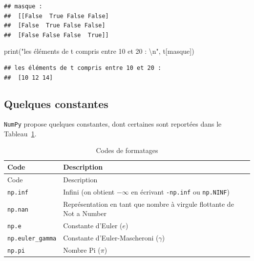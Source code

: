 \documentclass[
  12pt,
]{book}
\newenvironment{Shaded}{\begin{snugshade}}{\end{snugshade}}
\newcommand{\BuiltInTok}[1]{#1}
\newcommand{\CharTok}[1]{\textcolor[rgb]{0.31,0.60,0.02}{#1}}
\newcommand{\NormalTok}[1]{#1}
\newcommand{\StringTok}[1]{\textcolor[rgb]{0.31,0.60,0.02}{#1}}
\numberwithin{equation}{section}
\numberwithin{countremarque}{section}
\begin{document}
\begin{lstlisting}
## masque : 
##  [[False  True False False]
##  [False  True False False]
##  [False False False  True]]
\end{lstlisting}

\begin{Shaded}
\begin{Highlighting}[]
\BuiltInTok{print}\NormalTok{(}\StringTok{"les éléments de t compris entre 10 et 20 : }\CharTok{\textbackslash{}n}\StringTok{"}\NormalTok{,}
\NormalTok{      t[masque])}
\end{Highlighting}
\end{Shaded}

\begin{lstlisting}
## les éléments de t compris entre 10 et 20 : 
##  [10 12 14]
\end{lstlisting}

\subsection{Quelques constantes}\label{numpy-constantes}

\texttt{NumPy} propose quelques constantes, dont certaines sont reportées dans le Tableau~\ref{tab:constantes-numpy}.

\begin{longtable}[]{@{}
  >{\raggedleft\arraybackslash}p{}
  >{\raggedleft\arraybackslash}p{}@{}}
\caption{\label{tab:constantes-numpy} Codes de formatages}\tabularnewline
\toprule\noalign{}
\begin{minipage}[b]{\linewidth}\raggedleft
Code
\end{minipage} & \begin{minipage}[b]{\linewidth}\raggedleft
Description
\end{minipage} \\
\midrule\noalign{}
\endfirsthead
\toprule\noalign{}
\begin{minipage}[b]{\linewidth}\raggedleft
Code
\end{minipage} & \begin{minipage}[b]{\linewidth}\raggedleft
Description
\end{minipage} \\
\midrule\noalign{}
\endhead
\bottomrule\noalign{}
\endlastfoot
\texttt{np.inf} & Infini (on obtient \(-\infty\) en écrivant \texttt{-np.inf} ou \texttt{np.NINF}) \\
\texttt{np.nan} & Représentation en tant que nombre à virgule flottante de Not a Number \\
\texttt{np.e} & Constante d'Euler (\(e\)) \\
\texttt{np.euler\_gamma} & Constante d'Euler-Mascheroni (\(\gamma\)) \\
\texttt{np.pi} & Nombre Pi (\(\pi\)) \\
\end{longtable}
\end{document}
